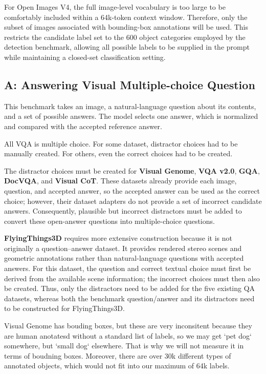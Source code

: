 \documentclass{article}
\begin{document}
For Open Images V4, the full image-level vocabulary is too large to be comfortably included within a 64k-token context window. Therefore, only the subset of images associated with bounding-box annotations will be used. This restricts the candidate label set to the 600 object categories employed by the detection benchmark, allowing all possible labels to be supplied in the prompt while maintaining a closed-set classification setting.

\subsection{\textbf{A:} Answering Visual Multiple-choice Question}

This benchmark takes an image, a natural-language question about its contents, and a set of possible answers. The model selects one answer, which is normalized and compared with the accepted reference answer.

All VQA is multiple choice. For some dataset, distractor choices had to be manually created. For others, even the correct choices had to be created.

The distractor choices must be created for \textbf{Visual Genome}, \textbf{VQA v2.0}, \textbf{GQA}, \textbf{DocVQA}, and \textbf{Visual CoT}. These datasets already provide each image, question, and accepted answer, so the accepted answer can be used as the correct choice; however, their dataset adapters do not provide a set of incorrect candidate answers. Consequently, plausible but incorrect distractors must be added to convert these open-answer questions into multiple-choice questions.

\textbf{FlyingThings3D} requires more extensive construction because it is not originally a question--answer dataset. It provides rendered stereo scenes and geometric annotations rather than natural-language questions with accepted answers. For this dataset, the question and correct textual choice must first be derived from the available scene information; the incorrect choices must then also be created. Thus, only the distractors need to be added for the five existing QA datasets, whereas both the benchmark question/answer and its distractors need to be constructed for FlyingThings3D.

Visual Genome has bouding boxes, but these are very inconsitent because they are human anotatesd without a standard list of labels, so we may get `pet dog` somewhere, but `small dog` elsewhere. That is why we will not measure it in terms of boudning boxes. Moreover, there are over 30k different types of annotated objects, which would not fit into our maximum of 64k labels.
\end{document}
